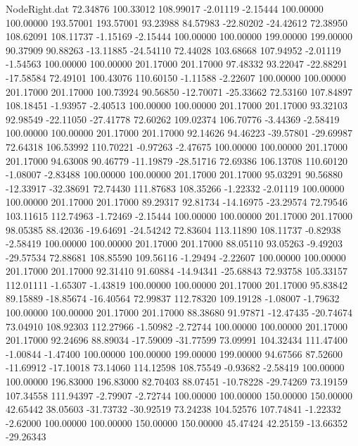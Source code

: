\begin{filecontents}{NodeRight.dat}
  72.34876  100.33012  108.99017    -2.01119   -2.15444  100.00000  100.00000  193.57001  193.57001   93.23988   84.57983  -22.80202  -24.42612
  72.38950  108.62091  108.11737    -1.15169   -2.15444  100.00000  100.00000  199.00000  199.00000   90.37909   90.88263  -13.11885  -24.54110
  72.44028  103.68668  107.94952    -2.01119   -1.54563  100.00000  100.00000  201.17000  201.17000   97.48332   93.22047  -22.88291  -17.58584
  72.49101  100.43076  110.60150    -1.11588   -2.22607  100.00000  100.00000  201.17000  201.17000  100.73924   90.56850  -12.70071  -25.33662
  72.53160  107.84897  108.18451    -1.93957   -2.40513  100.00000  100.00000  201.17000  201.17000   93.32103   92.98549  -22.11050  -27.41778
  72.60262  109.02374  106.70776    -3.44369   -2.58419  100.00000  100.00000  201.17000  201.17000   92.14626   94.46223  -39.57801  -29.69987
  72.64318  106.53992  110.70221    -0.97263   -2.47675  100.00000  100.00000  201.17000  201.17000   94.63008   90.46779  -11.19879  -28.51716
  72.69386  106.13708  110.60120    -1.08007   -2.83488  100.00000  100.00000  201.17000  201.17000   95.03291   90.56880  -12.33917  -32.38691
  72.74430  111.87683  108.35266    -1.22332   -2.01119  100.00000  100.00000  201.17000  201.17000   89.29317   92.81734  -14.16975  -23.29574
  72.79546  103.11615  112.74963    -1.72469   -2.15444  100.00000  100.00000  201.17000  201.17000   98.05385   88.42036  -19.64691  -24.54242
  72.83604  113.11890  108.11737    -0.82938   -2.58419  100.00000  100.00000  201.17000  201.17000   88.05110   93.05263   -9.49203  -29.57534
  72.88681  108.85590  109.56116    -1.29494   -2.22607  100.00000  100.00000  201.17000  201.17000   92.31410   91.60884  -14.94341  -25.68843
  72.93758  105.33157  112.01111    -1.65307   -1.43819  100.00000  100.00000  201.17000  201.17000   95.83842   89.15889  -18.85674  -16.40564
  72.99837  112.78320  109.19128    -1.08007   -1.79632  100.00000  100.00000  201.17000  201.17000   88.38680   91.97871  -12.47435  -20.74674
  73.04910  108.92303  112.27966    -1.50982   -2.72744  100.00000  100.00000  201.17000  201.17000   92.24696   88.89034  -17.59009  -31.77599
  73.09991  104.32434  111.47400    -1.00844   -1.47400  100.00000  100.00000  199.00000  199.00000   94.67566   87.52600  -11.69912  -17.10018
  73.14060  114.12598  108.75549    -0.93682   -2.58419  100.00000  100.00000  196.83000  196.83000   82.70403   88.07451  -10.78228  -29.74269
  73.19159  107.34558  111.94397    -2.79907   -2.72744  100.00000  100.00000  150.00000  150.00000   42.65442   38.05603  -31.73732  -30.92519
  73.24238  104.52576  107.74841    -1.22332   -2.62000  100.00000  100.00000  150.00000  150.00000   45.47424   42.25159  -13.66352  -29.26343

\end{filecontents}
